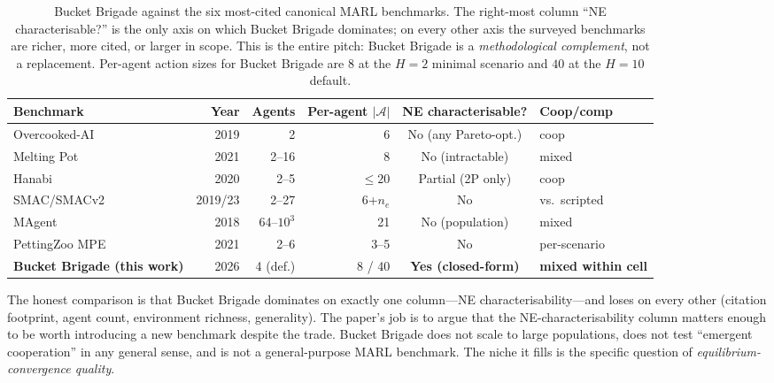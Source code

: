 \documentclass{anvil-paper}
\begin{document}
\begin{table}[t]
  \centering
  \small
  \setlength{\tabcolsep}{4pt}
  \begin{tabular}{lrrrcl}
    \toprule
    Benchmark & Year & Agents & Per-agent $|\mathcal{A}|$ & NE characterisable? & Coop/comp \\
    \midrule
    Overcooked-AI~\citep{overcooked2019}      & 2019      & 2        & 6          & No (any Pareto-opt.) & coop \\
    Melting Pot~\citep{meltingpot2021}        & 2021      & 2--16    & 8          & No (intractable)     & mixed \\
    Hanabi~\citep{hanabi2020}                 & 2020      & 2--5     & $\leq 20$  & Partial (2P only)    & coop \\
    SMAC/SMACv2~\citep{smac2019,smacv2_2023}  & 2019/23   & 2--27    & 6+$n_e$    & No                   & vs.\ scripted \\
    MAgent~\citep{magent2018}                 & 2018      & 64--$10^3$ & 21       & No (population)      & mixed \\
    PettingZoo MPE~\citep{pettingzoo2021}     & 2021      & 2--6     & 3--5       & No                   & per-scenario \\
    \textbf{Bucket Brigade (this work)}       & 2026      & 4 (def.) & 8 / 40     & \textbf{Yes (closed-form)} & \textbf{mixed within cell} \\
    \bottomrule
  \end{tabular}
  \caption{Bucket Brigade against the six most-cited canonical MARL
  benchmarks. The right-most column ``NE characterisable?'' is the only
  axis on which Bucket Brigade dominates; on every other axis the
  surveyed benchmarks are richer, more cited, or larger in scope. This is
  the entire pitch: Bucket Brigade is a \emph{methodological complement},
  not a replacement. Per-agent action sizes for Bucket Brigade are
  $8$ at the $H{=}2$ minimal scenario and $40$ at the $H{=}10$ default.}
  \label{tab:bench}
\end{table}

The honest comparison is that Bucket Brigade dominates on exactly one
column---NE characterisability---and loses on every other (citation
footprint, agent count, environment richness, generality). The paper's job
is to argue that the NE-characterisability column matters enough to be worth
introducing a new benchmark despite the trade. Bucket Brigade does not
scale to large populations, does not test ``emergent cooperation'' in
any general sense, and is not a general-purpose MARL benchmark. The
niche it fills is the specific question of
\emph{equilibrium-convergence quality}.
\end{document}
